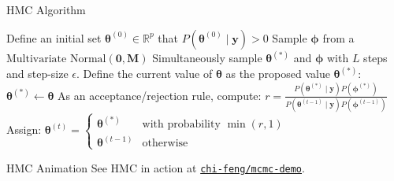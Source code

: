 \begin{frame}[fragile]{HMC Algorithm}
	\SetAlCapFnt{\normalsize}
	\SetAlCapNameFnt{\normalsize}
	\begin{algorithm}[H]
		\DontPrintSemicolon
		\SetAlgoNoEnd
		\SetAlgoLined
		\footnotesize
		Define an initial set $\boldsymbol{\theta}^{(0)} \in \mathbb{R}^p$ that $P\left(\boldsymbol{\theta}^{(0)} \mid \mathbf{y} \right) > 0$\;
		Sample $\boldsymbol{\phi}$ from a $\text{Multivariate Normal}(\mathbf{0},\mathbf{M})$\;
		Simultaneously sample $\boldsymbol{\theta}^{(*)}$ and $\boldsymbol{\phi}$ with $L$ steps and step-size $\epsilon$.\;
		Define the current value of $\boldsymbol{\theta}$ as the proposed value $\boldsymbol{\theta}^{(*)}$:
		$\boldsymbol{\theta}^{(*)} \leftarrow \boldsymbol{\theta}$\;
		As an acceptance/rejection rule, compute:
		$r = \frac{P \left(\boldsymbol{\theta}^{(*)} \mid \mathbf{y} \right) P \left(\boldsymbol{\phi}^{(*)} \right)}{P \left(\boldsymbol{\theta}^{(t-1)} \mid \mathbf{y} \right) P \left(\boldsymbol{\phi}^{(t-1)} \right)}$\;
		Assign:
		$
			\boldsymbol{\theta}^{(t)} =
			\begin{cases}
				\boldsymbol{\theta}^{(*)}   & \text{with probability $\min(r,1)$} \\
				\boldsymbol{\theta}^{(t-1)} & \text{otherwise}
			\end{cases}
		$\;
		\caption{Hamiltonian Monte Carlo (HMC)}
	\end{algorithm}
\end{frame}

\begin{frame}{HMC Animation}
	See HMC in action at \href{https://chi-feng.github.io/mcmc-demo/app.html?algorithm=HamiltonianHMC&target=banana}{\texttt{chi-feng/mcmc-demo}}.
\end{frame}

